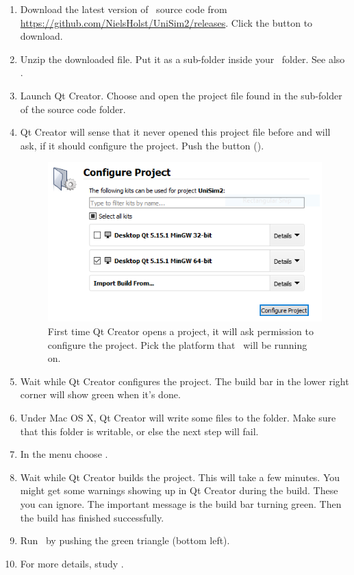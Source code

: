 \begin{enumerate}
\item Download the latest version of \US\ source code from \url{https://github.com/NielsHolst/UniSim2/releases}. Click the  button to download.
\item Unzip the downloaded file. Put it as a sub-folder inside your \devhomefolderexplained\ folder. See also .
\item Launch Qt Creator. Choose  and open the  project file found in the  sub-folder of the source code folder.
\item Qt Creator will sense that it never opened this project file before and will ask, if it should configure the project. Push the  button ().

\begin{figure} [h]
\centering
\includegraphics[width=\textwidth]{graphics/build-us-1}
\caption{First time Qt Creator opens a project, it will ask permission to configure the project. Pick the platform that \US\ will be running on.}
\label{fig:build-us-1}
\end{figure}

\item Wait while Qt Creator configures the project. The build bar in the lower right corner will show green when it's done.
\item Under Mac OS X, Qt Creator will write some files to the  folder. Make sure that this folder is writable, or else the next step will fail.
\item  In the  menu choose .
\item Wait while Qt Creator builds the project. This will take a few minutes. You might get some warnings showing up in Qt Creator during the build. These you can ignore. The important message is the build bar turning green. Then the build has finished successfully.
\item Run \US\ by pushing the green triangle (bottom left).
\item For more details, study .
\end{enumerate} 